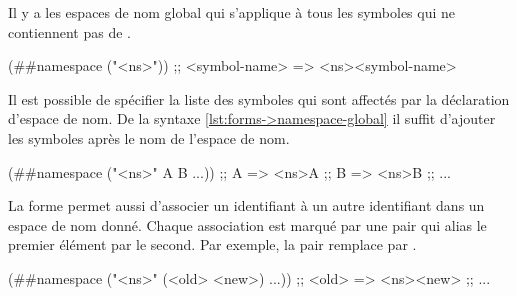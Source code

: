 Il y a les espaces de nom global qui s'applique à tous les symboles qui ne
contiennent pas de \lstcode{#}.
\begin{center}
  \begin{mplisting}{0.6}
(##namespace ("<ns>"))
;; <symbol-name> => <ns><symbol-name>
\end{mplisting}
\end{center}
Il est possible de spécifier la liste des symboles qui sont affectés par
la déclaration d'espace de nom. De la syntaxe \ref{lst:forms->namespace-global}
il suffit d'ajouter les symboles après le nom de l'espace de nom.\\
\begin{center}
  \begin{mplisting}{0.6}
(##namespace ("<ns>" A B ...))
;; A => <ns>A
;; B => <ns>B
;; ...
\end{mplisting}
\end{center}
La forme  permet aussi d'associer un identifiant à un
autre identifiant dans un espace de nom donné. Chaque association est marqué
par une pair qui alias le premier élément par le second. Par exemple, la pair
 remplace  par .\\
\begin{center}
  \begin{mplisting}{0.6}
(##namespace ("<ns>" (<old> <new>) ...))
;; <old> => <ns><new>
;; ...
\end{mplisting}
\end{center}



